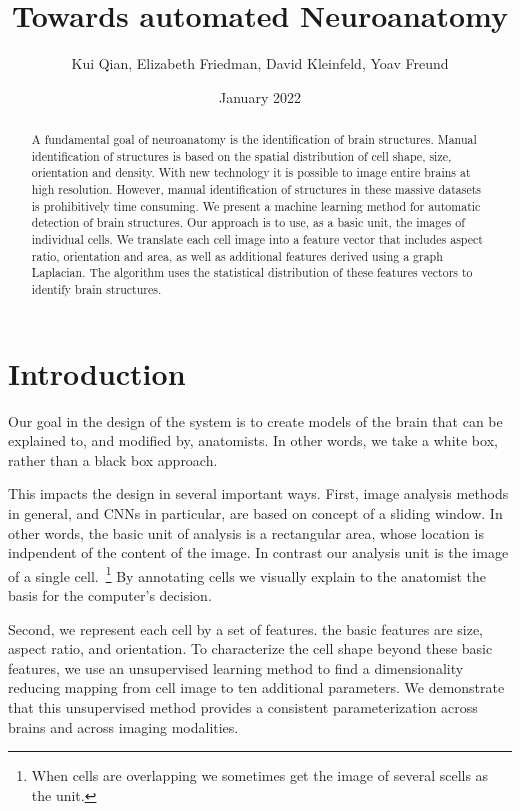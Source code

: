 \documentclass[runningheads]{llncs}
\title{Towards automated Neuroanatomy}
\author{Kui Qian, Elizabeth Friedman, David Kleinfeld, Yoav Freund}
\date{January 2022}
\begin{document}
\maketitle

\begin{abstract}
  A fundamental goal of neuroanatomy is the identification of brain
  structures.  Manual identification of structures is based on the
  spatial distribution of cell shape, size, orientation and density.
  With new technology it is possible to image entire brains at high
  resolution.  However, manual identification of structures in these
  massive datasets is prohibitively time consuming.  We present a
  machine learning method for automatic detection of brain structures.
  Our approach is to use, as a basic unit, the images of individual
  cells.  We translate each cell image into a feature vector that
  includes aspect ratio, orientation and area, as well as additional
  features derived using a graph Laplacian. The algorithm uses the
  statistical distribution of these features vectors to identify brain
  structures.
\end{abstract}

\section{Introduction}

Our goal in the design of the system is to create models of the brain
that can be explained to, and modified by, anatomists. In other words,
we take a white box, rather than a black box approach.

This impacts the design in several important ways. First, image
analysis methods in general, and CNNs in particular, are based on
concept of a sliding window. In other words, the basic unit of
analysis is a rectangular area, whose location is indpendent of the
content of the image. In contrast our analysis unit is the image of a
single cell.~\footnote{When cells are overlapping we sometimes get
  the image of several scells as the unit.} By annotating cells we
visually explain to the anatomist the basis for the computer's
decision.

Second, we represent each cell by a set of features. the basic 
features are size, aspect ratio, and orientation. To characterize the
cell shape beyond these basic features, we use an unsupervised
learning method to find a dimensionality reducing mapping from cell
image to ten additional parameters. We demonstrate that this
unsupervised method provides a consistent parameterization across
brains and across imaging modalities.
\end{document}
